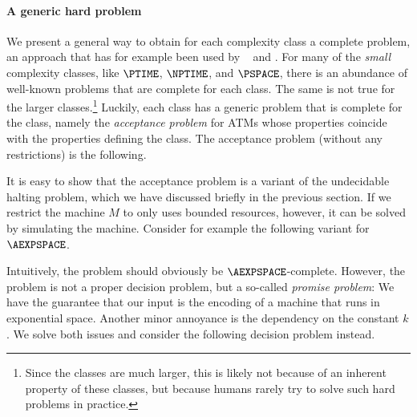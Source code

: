 \documentclass[../../diss.tex]{subfiles}
\begin{document}
\paragraph{A generic hard problem}

We present a general way to obtain for each complexity class a complete problem, an approach that has for example been used by \citeauthor{MeyerS72}~\cite{MeyerS72,StockmeyerM73} and .
For many of the \emph{small} complexity classes, like $\PTIME$, $\NPTIME$,  and $\PSPACE$, there is an abundance of well-known problems that are complete for each class.
The same is not true for the larger classes.\footnote{
    Since the classes are much larger, this is likely not because of an inherent property of these classes, but because humans rarely try to solve such hard problems in practice.
}
Luckily, each class has a generic problem that is complete for the class, namely the \emph{acceptance problem} for ATMs whose properties coincide with the properties defining the class.
The acceptance problem (without any restrictions) is the following.
\begin{problem}
\end{problem}

It is easy to show that the acceptance problem is a variant of the undecidable halting problem, which we have discussed briefly in the previous section.
If we restrict the machine $M$ to only uses bounded resources, however, it can be solved by simulating the machine.
Consider for example the following variant for $\AEXPSPACE$.

\begin{problem}
\end{problem}

Intuitively, the problem should obviously be $\AEXPSPACE$-complete.
However, the problem is not a proper decision problem, but a so-called \emph{promise problem}: We have the guarantee that our input is the encoding of a machine that runs in exponential space.
Another minor annoyance is the dependency on the constant $k$.
We solve both issues and consider the following decision problem instead.
\end{document}
